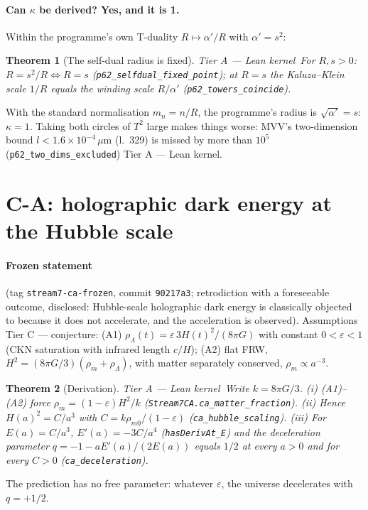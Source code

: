 \documentclass[11pt,a4paper]{article}
\newtheorem{theorem}{Theorem}[section]
\theoremstyle{remark}
\newcommand{\tierA}{\colorbox{green!15}{\textsf{\scriptsize Tier A --- Lean kernel}}}
\newcommand{\tierC}{\colorbox{orange!15}{\textsf{\scriptsize Tier C --- conjecture}}}
\newcommand{\lean}[1]{\texttt{#1}}
\begin{document}
\paragraph{Can $\kappa$ be derived? Yes, and it is 1.} Within the programme's own T-duality $R\mapsto\alpha'/R$
with $\alpha'=s^2$:
\begin{theorem}[The self-dual radius is fixed] \tierA\ \label{thm:kappa}
For $R,s>0$: $R=s^2/R\iff R=s$ (\lean{p62\_selfdual\_fixed\_point}); at $R=s$ the Kaluza--Klein scale $1/R$ equals
the winding scale $R/\alpha'$ (\lean{p62\_towers\_coincide}).
\end{theorem}
With the standard normalisation $m_n=n/R$, the programme's radius is $\sqrt{\alpha'}=s$: $\kappa=1$. Taking both
circles of $T^2$ large makes things worse: MVV's two-dimension bound $l<1.6\times10^{-4}\,\mu$m (l.~329) is missed
by more than $10^5$ (\lean{p62\_two\_dims\_excluded}) \tierA.

\section{C-A: holographic dark energy at the Hubble scale}
\label{sec:ca}

\paragraph{Frozen statement} (tag \texttt{stream7-ca-frozen}, commit \texttt{90217a3}; retrodiction with a
foreseeable outcome, disclosed: Hubble-scale holographic dark energy is classically objected to because it does
not accelerate, and the acceleration is observed). Assumptions \tierC: (A1) $\rho_\Lambda(t)=\varepsilon\,
3H(t)^2/(8\pi G)$ with constant $0<\varepsilon<1$ (CKN saturation with infrared length $c/H$); (A2) flat FRW,
$H^2=(8\pi G/3)(\rho_m+\rho_\Lambda)$, with matter separately conserved, $\rho_m\propto a^{-3}$.

\begin{theorem}[Derivation] \tierA\ \label{thm:ca}
Write $k=8\pi G/3$. (i) (A1)--(A2) force $\rho_m=(1-\varepsilon)H^2/k$ (\lean{Stream7CA.ca\_matter\_fraction}).
(ii) Hence $H(a)^2=C/a^3$ with $C=k\rho_{m0}/(1-\varepsilon)$ (\lean{ca\_hubble\_scaling}). (iii) For $E(a)=C/a^3$,
$E'(a)=-3C/a^4$ (\lean{hasDerivAt\_E}) and the deceleration parameter $q=-1-aE'(a)/(2E(a))$ equals $1/2$ at every
$a>0$ and for every $C>0$ (\lean{ca\_deceleration}).
\end{theorem}
The prediction has no free parameter: whatever $\varepsilon$, the universe decelerates with $q=+1/2$.
\end{document}
